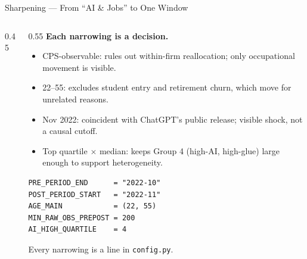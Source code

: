 \documentclass[10pt,english,aspectratio=169]{beamer}
\begin{document}
\begin{frame}[fragile]{Sharpening --- From ``AI \& Jobs'' to One Window}
\begin{columns}[T]
\begin{column}{0.45\textwidth}
\begin{center}
\end{center}
\end{column}
\begin{column}{0.55\textwidth}
\textbf{Each narrowing is a decision.}
\begin{itemize}\scriptsize
  \item CPS-observable: rules out within-firm reallocation; only occupational movement is visible.
  \item 22--55: excludes student entry and retirement churn, which move for unrelated reasons.
  \item Nov 2022: coincident with ChatGPT's public release; visible shock, not a causal cutoff.
  \item Top quartile $\times$ median: keeps Group 4 (high-AI, high-glue) large enough to support heterogeneity.
\end{itemize}
\vspace{0.1cm}
\begin{tcolorbox}[colback=gray!5,colframe=gray!40]
\begin{lstlisting}[style=pythonstyle,numbers=none,basicstyle=\ttfamily\scriptsize]
PRE_PERIOD_END      = "2022-10"
POST_PERIOD_START   = "2022-11"
AGE_MAIN            = (22, 55)
MIN_RAW_OBS_PREPOST = 200
AI_HIGH_QUARTILE    = 4
\end{lstlisting}
\end{tcolorbox}
Every narrowing is a line in \texttt{config.py}.
\end{column}
\end{columns}
\end{frame}
\end{document}
